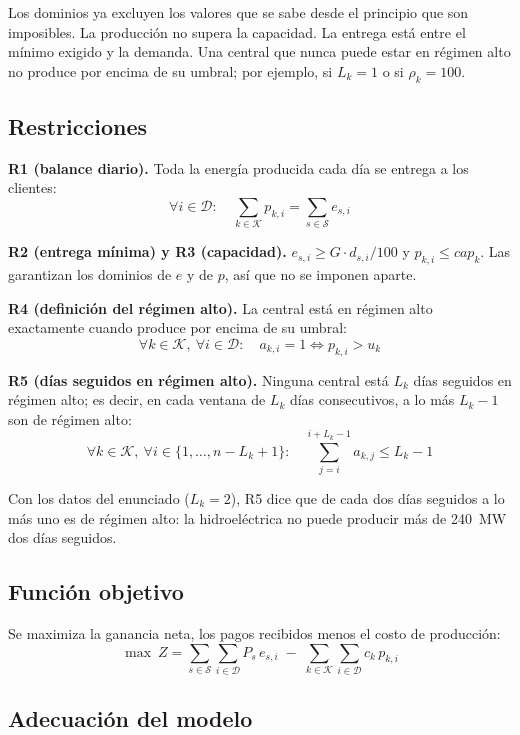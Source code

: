 Los dominios ya excluyen los valores que se sabe desde el principio que son imposibles. La producción no supera la capacidad. La entrega está entre el mínimo exigido y la demanda. Una central que nunca puede estar en régimen alto no produce por encima de su umbral; por ejemplo, si $L_k = 1$ o si $\rho_k = 100$.

\subsection{Restricciones}

\textbf{R1 (balance diario).} Toda la energía producida cada día se entrega a los clientes:
\[
    \forall i \in \mathcal{D}:\quad \sum_{k \in \mathcal{K}} p_{k,i} = \sum_{s \in \mathcal{S}} e_{s,i}
\]

\textbf{R2 (entrega mínima) y R3 (capacidad).} $e_{s,i} \ge G \cdot d_{s,i} / 100$ y $p_{k,i} \le \mathit{cap}_k$. Las garantizan los dominios de $e$ y de $p$, así que no se imponen aparte.

\textbf{R4 (definición del régimen alto).} La central está en régimen alto exactamente cuando produce por encima de su umbral:
\[
    \forall k \in \mathcal{K},\ \forall i \in \mathcal{D}:\quad a_{k,i} = 1 \iff p_{k,i} > u_k
\]

\textbf{R5 (días seguidos en régimen alto).} Ninguna central está $L_k$ días seguidos en régimen alto; es decir, en cada ventana de $L_k$ días consecutivos, a lo más $L_k - 1$ son de régimen alto:
\[
    \forall k \in \mathcal{K},\ \forall i \in \{1, \dots, n - L_k + 1\}:\quad \sum_{j=i}^{i+L_k-1} a_{k,j} \le L_k - 1
\]

Con los datos del enunciado ($L_k = 2$), R5 dice que de cada dos días seguidos a lo más uno es de régimen alto: la hidroeléctrica no puede producir más de 240~MW dos días seguidos.

\subsection{Función objetivo}

Se maximiza la ganancia neta, los pagos recibidos menos el costo de producción:
\[
    \max\ Z = \sum_{s \in \mathcal{S}} \sum_{i \in \mathcal{D}} P_s \, e_{s,i} \; - \; \sum_{k \in \mathcal{K}} \sum_{i \in \mathcal{D}} c_k \, p_{k,i}
\]

\subsection{Adecuación del modelo}

